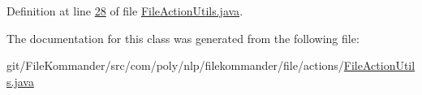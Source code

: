 Definition at line \hyperlink{L28}{28} of file \hyperlink{}{File\-Action\-Utils.\-java}.



The documentation for this class was generated from the following file\-:\begin{DoxyCompactItemize}
\item 
git/\-File\-Kommander/src/com/poly/nlp/filekommander/file/actions/\hyperlink{_file_action_utils_8java}{File\-Action\-Utils.\-java}\end{DoxyCompactItemize}
